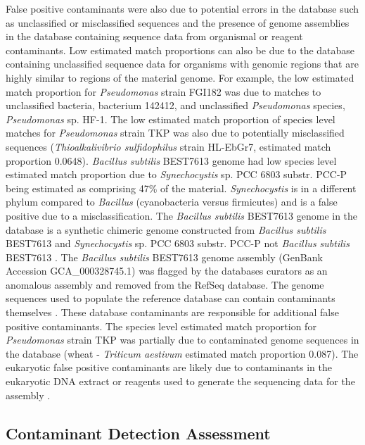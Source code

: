 \documentclass[fleqn,10pt,lineno]{wlpeerj}\usepackage[]{graphicx}\usepackage[]{color}
\begin{document}
False positive contaminants were also due to potential errors in the database such as unclassified or misclassified sequences and the presence of genome assemblies in the database containing sequence data from organismal or reagent contaminants.
Low estimated match proportions can also be due to the database containing unclassified sequence data for organisms with genomic regions that are highly similar to regions of the material genome.
For example, the low estimated match proportion for \textit{Pseudomonas} strain FGI182 was due to matches to unclassified bacteria, bacterium 142412, and unclassified \textit{Pseudomonas} species, \textit{Pseudomonas} sp. HF-1.
The low estimated match proportion of species level matches for \textit{Pseudomonas} strain TKP was also due to potentially misclassified sequences (\textit{Thioalkalivibrio sulfidophilus} strain HL-EbGr7, estimated match proportion 0.0648).
\textit{Bacillus subtilis} BEST7613 genome had low species level estimated match proportion due to \textit{Synechocystis} sp. PCC 6803 substr. PCC-P being estimated as comprising 47\% of the material.
\textit{Synechocystis} is in a different phylum compared to \textit{Bacillus} (cyanobacteria versus firmicutes) and is a false positive due to a misclassification.
The \textit{Bacillus subtilis} BEST7613 genome in the database is a synthetic chimeric genome constructed from \textit{Bacillus subtilis} BEST7613 and \textit{Synechocystis} sp. PCC 6803 substr. PCC-P not \textit{Bacillus subtilis} BEST7613 \citep{watanabe2012complete}. 
The \textit{Bacillus subtilis} BEST7613 genome assembly (GenBank Accession GCA\_000328745.1) was flagged by the databases curators as an anomalous assembly and removed from the RefSeq database.  
The genome sequences used to populate the reference database can contain contaminants themselves \citep{parks2015checkm}.
These database contaminants are responsible for additional false positive contaminants.
The species level estimated match proportion for \textit{Pseudomonas} strain TKP was partially due to contaminated genome sequences in the database (wheat - \textit{Triticum aestivum} estimated match proportion 0.087).
The eukaryotic false positive contaminants are likely due to contaminants in the eukaryotic DNA extract or reagents used to generate the sequencing data for the assembly \citep{parks2015checkm}.

\subsection*{Contaminant Detection Assessment}
\end{document}

